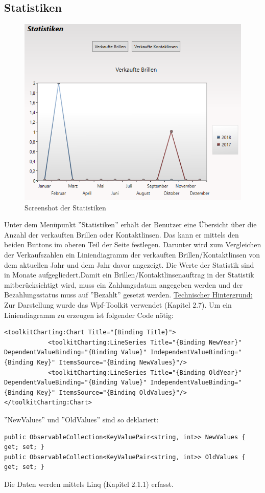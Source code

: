 \subsection{Statistiken}
\begin{figure}[H]
\begin{center}
	\includegraphics[scale=.65]{images/Statistiken.png}
\end{center}
	\caption{Screenshot der Statistiken}
	\label{fig:sample}
\end{figure}
Unter dem Menüpunkt ''Statistiken'' erhält der Benutzer eine Übersicht über die Anzahl der verkauften Brillen oder Kontaktlinsen. Das kann er mittels den beiden Buttons im oberen Teil der Seite festlegen. Darunter wird zum Vergleichen der Verkaufszahlen ein Liniendiagramm der verkauften Brillen/Kontaktlinsen von dem aktuellen Jahr und dem Jahr davor angezeigt. Die Werte der Statistik sind in Monate aufgegliedert.\newline Damit ein Brillen/Kontaktlinsenauftrag in der Statistik mitberücksichtigt wird, muss ein Zahlungsdatum angegeben werden und der Bezahlungsstatus muss auf ''Bezahlt'' gesetzt werden.\newline
\underline{Technischer Hintergrund:}
Zur Darstellung wurde das Wpf-Toolkit verwendet (Kapitel 2.7). \newline
Um ein Liniendiagramm zu erzeugen ist folgender Code nötig:
\begin{lstlisting}
<toolkitCharting:Chart Title="{Binding Title}">
            <toolkitCharting:LineSeries Title="{Binding NewYear}"  DependentValueBinding="{Binding Value}" IndependentValueBinding="{Binding Key}" ItemsSource="{Binding NewValues}"/>
            <toolkitCharting:LineSeries Title="{Binding OldYear}"  DependentValueBinding="{Binding Value}" IndependentValueBinding="{Binding Key}" ItemsSource="{Binding OldValues}"/>
</toolkitCharting:Chart>
\end{lstlisting}
''NewValues'' und ''OldValues'' sind so deklariert: 
\begin{lstlisting}
public ObservableCollection<KeyValuePair<string, int>> NewValues { get; set; }
public ObservableCollection<KeyValuePair<string, int>> OldValues { get; set; }
\end{lstlisting}
Die Daten werden mittels Linq (Kapitel 2.1.1) erfasst.
